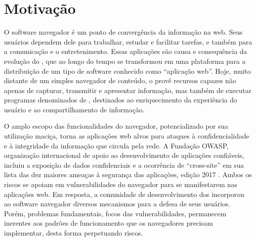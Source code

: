 \section{Motivação}


O software navegador é um ponto de convergência da informação na web. Seus usuários dependem dele para trabalhar, estudar e facilitar tarefas, e também para a comunicação e o entretenimento. Essas aplicações são causa e consequência da evolução do , que ao longo do tempo se transformou em uma plataforma para a distribuição de um tipo de software conhecido como ``aplicação web''. Hoje, muito distante de um simples navegador de conteúdo, o  provê recursos capazes não apenas de capturar, transmitir e apresentar informação, mas também de executar programas denominados de \scripts{}, destinados ao enriquecimento da experiência do usuário e ao compartilhamento de informação.

O amplo escopo das funcionalidades do navegador, potencializado por sua utilização maciça, torna as aplicações web alvos para ataques à confidencialidade e à integridade da informação que circula pela rede. A Fundação OWASP, organização internacional de apoio ao desenvolvimento de aplicações confiáveis, incluiu a exposição de dados confidenciais e a ocorrência de {\scripts} ``cross-site''  em sua lista das dez maiores ameaças à segurança das aplicações, edição 2017 \cite{OWASP:Top10}. Ambos os riscos se apoiam em vulnerabilidades do navegador para se manifestarem nas aplicações web. Em resposta, a comunidade de desenvolvimento dos  incorporou ao software navegador diversos mecanismos para a defesa de seus usuários. Porém, problemas fundamentais, focos das vulnerabilidades, permanecem inerentes aos padrões de funcionamento que os navegadores precisam implementar, desta forma perpetuando riscos.

